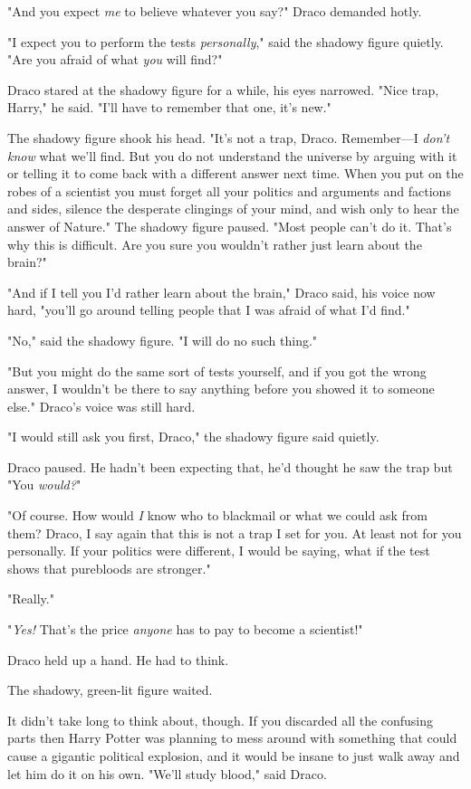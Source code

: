 "And you expect \emph{me} to believe whatever you say?" Draco demanded hotly.

"I expect you to perform the tests \emph{personally}," said the shadowy figure
quietly. "Are you afraid of what \emph{you} will find?"

Draco stared at the shadowy figure for a while, his eyes narrowed. "Nice trap,
Harry," he said. "I'll have to remember that one, it's new."

The shadowy figure shook his head. "It's not a trap, Draco. Remember—I
\emph{don't know} what we'll find. But you do not understand the universe by
arguing with it or telling it to come back with a different answer next time.
When you put on the robes of a scientist you must forget all your politics and
arguments and factions and sides, silence the desperate clingings of your mind,
and wish only to hear the answer of Nature." The shadowy figure paused. "Most
people can't do it. That's why this is difficult. Are you sure you wouldn't
rather just learn about the brain?"

"And if I tell you I'd rather learn about the brain," Draco said, his voice now
hard, "you'll go around telling people that I was afraid of what I'd find."

"No," said the shadowy figure. "I will do no such thing."

"But you might do the same sort of tests yourself, and if you got the wrong
answer, I wouldn't be there to say anything before you showed it to someone
else." Draco's voice was still hard.

"I would still ask you first, Draco," the shadowy figure said quietly.

Draco paused. He hadn't been expecting that, he'd thought he saw the trap
but{\el} "You \emph{would?}"

"Of course. How would \emph{I} know who to blackmail or what we could ask from
them? Draco, I say again that this is not a trap I set for you. At least not
for you personally. If your politics were different, I would be saying, what if
the test shows that purebloods are stronger."

"Really."

"\emph{Yes!} That's the price \emph{anyone} has to pay to become a scientist!"

Draco held up a hand. He had to think.

The shadowy, green-lit figure waited.

It didn't take long to think about, though. If you discarded all the confusing
parts{\el} then Harry Potter was planning to mess around with something that
could cause a gigantic political explosion, and it would be insane to just walk
away and let him do it on his own. "We'll study blood," said Draco.

